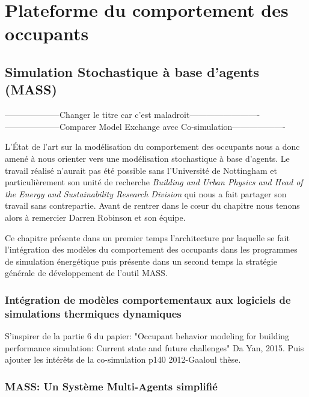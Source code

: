 \part{Plateforme du comportement des occupants}

\chapter{Simulation Stochastique à base d'agents (MASS)}
\label{MASS}

--------------------Changer le titre car c'est maladroit-------------------------
--------------------Comparer Model Exchange avec Co-simulation-------------------

L'État de l'art sur la modélisation du comportement des occupants nous a donc amené à nous orienter vers une modélisation stochastique à base d'agents. Le travail réalisé n'aurait pas été possible sans l'Université de Nottingham et particulièrement son unité de recherche \textit{Building and Urban Physics and Head of the Energy and Sustainability Research Division} qui nous a fait partager son travail sans contrepartie. Avant de rentrer dans le cœur du chapitre nous tenons alors à remercier Darren Robinson et son équipe. 

Ce chapitre présente dans un premier temps l'architecture par laquelle se fait l'intégration des modèles du comportement des occupants dans les programmes de simulation énergétique puis présente dans un second temps la stratégie générale de développement de l'outil MASS.

\section{Intégration de modèles comportementaux aux logiciels de simulations thermiques dynamiques}

S'inspirer de la partie 6 du papier: "Occupant behavior modeling for building performance simulation: Current state and future challenges"  Da Yan, 2015. Puis ajouter les intérêts de la co-simulation p140 2012-Gaaloul thèse.



\section{MASS: Un Système Multi-Agents simplifié}

